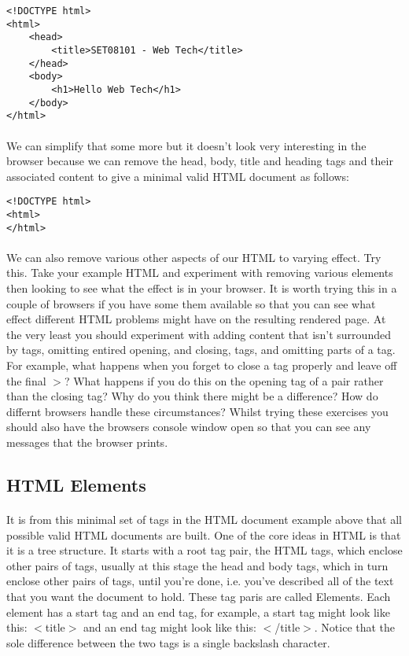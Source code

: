 \documentclass[10pt, a4paper]{article}
\begin{document}
\begin{lstlisting}
<!DOCTYPE html>
<html>
    <head>
        <title>SET08101 - Web Tech</title>
    </head>
    <body>
        <h1>Hello Web Tech</h1>
    </body>
</html>
\end{lstlisting}

\paragraph{} We can simplify that some more but it doesn't look very interesting in the browser because we can remove the head, body, title and heading tags and their associated content to give a minimal valid HTML document as follows:

\begin{lstlisting}
<!DOCTYPE html>
<html>
</html>
\end{lstlisting}

\paragraph{} We can also remove various other aspects of our HTML to varying effect. Try this. Take your example HTML and experiment with removing various elements then looking to see what the effect is in your browser. It is worth trying this in a couple of browsers if you have some them available so that you can see what effect different HTML problems might have on the resulting rendered page. At the very least you should experiment with adding content that isn't surrounded by tags, omitting entired opening, and closing, tags, and omitting parts of a tag. For example, what happens when you forget to close a tag properly and leave off the final $>$? What happens if you do this on the opening tag of a pair rather than the closing tag? Why do you think there might be a difference? How do differnt browsers handle these circumstances? Whilst trying these exercises you should also have the browsers console window open so that you can see any messages that the browser prints.

\subsection{HTML Elements}
\paragraph{} It is from this minimal set of tags in the HTML document example above that all possible valid HTML documents are built. One of the core ideas in HTML is that it is a tree structure. It starts with a root tag pair, the HTML tags, which enclose other pairs of tags, usually at this stage the head and body tags, which in turn enclose other pairs of tags, until you're done, i.e. you've described all of the text that you want the document to hold. These tag paris are called Elements. Each element has a start tag and an end tag, for example, a start tag might look like this: $<$title$>$ and an end tag might look like this: $<$/title$>$. Notice that the sole difference between the two tags is a single backslash character.
\end{document}
